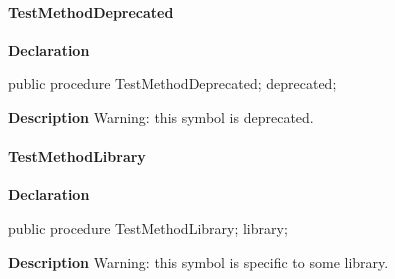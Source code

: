 \documentclass{report}
\newif\ifpdf
\begin{document}
\paragraph*{TestMethodDeprecated}\hspace*{\fill}

\label{ok_hint_directives.TTestClassDeprecated-TestMethodDeprecated}
\begin{list}{}{
\setlength{\itemindent}{0cm}
\setlength{\listparindent}{0cm}
\setlength{\leftmargin}{\evensidemargin}
\addtolength{\leftmargin}{\tmplength}
\settowidth{\labelsep}{X}
\addtolength{\leftmargin}{\labelsep}
\setlength{\labelwidth}{\tmplength}
}
\item[\textbf{Declaration}\hfill]
\ifpdf
\begin{flushleft}
\fi
\begin{ttfamily}
public procedure TestMethodDeprecated; deprecated;\end{ttfamily}

\ifpdf
\end{flushleft}
\fi

\par
\item[\textbf{Description}]
Warning: this symbol is deprecated.

 

\end{list}
\paragraph*{TestMethodLibrary}\hspace*{\fill}

\label{ok_hint_directives.TTestClassDeprecated-TestMethodLibrary}
\begin{list}{}{
\setlength{\itemindent}{0cm}
\setlength{\listparindent}{0cm}
\setlength{\leftmargin}{\evensidemargin}
\addtolength{\leftmargin}{\tmplength}
\settowidth{\labelsep}{X}
\addtolength{\leftmargin}{\labelsep}
\setlength{\labelwidth}{\tmplength}
}
\item[\textbf{Declaration}\hfill]
\ifpdf
\begin{flushleft}
\fi
\begin{ttfamily}
public procedure TestMethodLibrary; library;\end{ttfamily}

\ifpdf
\end{flushleft}
\fi

\par
\item[\textbf{Description}]
Warning: this symbol is specific to some library.

 

\end{list}
\end{document}
